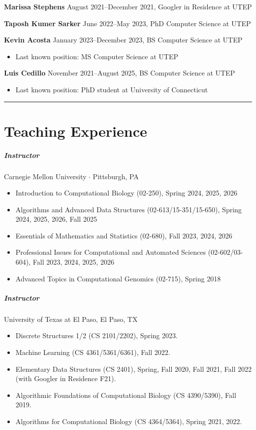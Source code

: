 \documentclass[10pt,letterpaper]{article}
\newcommand{\bigdot}{$\cdot$\xspace}
\newcommand{\cvsection}[1]{%
    \par\vspace{10pt}%
  \noindent\rule{\linewidth}{0.4pt}\par
  \vspace{-5.5ex}%
  \section*{#1}%
}
\begin{document}
\textbf{Marissa Stephens} August 2021--December 2021, Googler in Residence at UTEP

\textbf{Taposh Kumer Sarker} June 2022--May 2023, PhD Computer Science at UTEP

\textbf{Kevin Acosta} January 2023--December 2023, BS Computer Science at UTEP
\begin{itemize}
\item Last known position: MS Computer Science at UTEP
\end{itemize}

\textbf{Luis Cedillo} November 2021--August 2025, BS Computer Science at UTEP
\begin{itemize}
\item Last known position: PhD student at University of Connecticut 
\end{itemize}

\cvsection{Teaching Experience}

\subparagraph{Instructor}  Carnegie Mellon University \bigdot Pittsburgh, PA
\begin{itemize}
    \item Introduction to Computational Biology (02-250), Spring 2024, 2025, 2026\footnotemark[1]
    \item Algorithms and Advanced Data Structures (02-613/15-351/15-650), Spring 2024\footnotemark[1], 2025, 2026, Fall 2025
    \item Essentials of Mathematics and Statistics (02-680), Fall 2023\footnotemark[1], 2024, 2026
    \item Professional Issues for Computational and Automated Sciences (02-602/03-604), Fall 2023\footnotemark[1], 2024\footnotemark[1], 2025\footnotemark[1], 2026\footnotemark[1]
    \item Advanced Topics in Computational Genomics (02-715), Spring 2018\footnotemark[1]
 \end{itemize}

\subparagraph{Instructor}  University of Texas at El Paso, El Paso, TX
\begin{itemize}
	\item Discrete Structures 1/2 (CS 2101/2202), Spring 2023.
	\item Machine Learning (CS 4361/5361/6361), Fall 2022.
	\item Elementary Data Structures (CS 2401), Spring, Fall 2020, Fall 2021, Fall 2022 (with Googler in Residence F21).
	\item Algorithmic Foundations of Computational Biology (CS 4390/5390), Fall 2019.
	\item Algorithms for Computational Biology (CS 4364/5364), Spring 2021, 2022.
\end{itemize}
\end{document}
